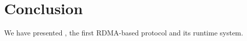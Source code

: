 \section{Conclusion} \label{sec:conclusion}

We have presented \xxx, the first RDMA-based \paxos protocol and its runtime 
system.
